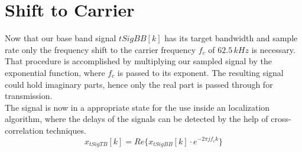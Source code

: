 \section{Shift to Carrier}

Now that our base band signal $tSigBB[k]$ has its target bandwidth and sample rate only the frequency shift to the carrier frequency $f_c$ of $62.5\,kHz$ is necessary. That procedure is accomplished by multiplying our sampled signal by the exponential function, where $f_c$ is passed to its exponent. The resulting signal could hold imaginary parts, hence only the real part is passed through for transmission.\\
The signal is now in a appropriate state for the use inside an localization algorithm, where the delays of the signals can be detected by the help of cross-correlation techniques.
\begin{equation}
	x_{tSigTB}[k]=Re\{x_{tSigBB}[k]\cdot e^{-2\pi j f_c k}\}
	\label{eq:shift}
\end{equation}


